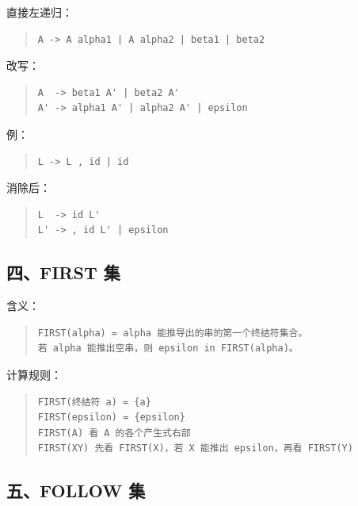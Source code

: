 \documentclass[UTF8,zihao=-4]{ctexart}
\begin{document}
直接左递归：


\begin{quote}
\footnotesize
\begin{verbatim}
A -> A alpha1 | A alpha2 | beta1 | beta2
\end{verbatim}
\end{quote}


改写：


\begin{quote}
\footnotesize
\begin{verbatim}
A  -> beta1 A' | beta2 A'
A' -> alpha1 A' | alpha2 A' | epsilon
\end{verbatim}
\end{quote}


例：


\begin{quote}
\footnotesize
\begin{verbatim}
L -> L , id | id
\end{verbatim}
\end{quote}


消除后：


\begin{quote}
\footnotesize
\begin{verbatim}
L  -> id L'
L' -> , id L' | epsilon
\end{verbatim}
\end{quote}


\subsection{四、FIRST 集}


含义：


\begin{quote}
\footnotesize
\begin{verbatim}
FIRST(alpha) = alpha 能推导出的串的第一个终结符集合。
若 alpha 能推出空串，则 epsilon in FIRST(alpha)。
\end{verbatim}
\end{quote}


计算规则：


\begin{quote}
\footnotesize
\begin{verbatim}
FIRST(终结符 a) = {a}
FIRST(epsilon) = {epsilon}
FIRST(A) 看 A 的各个产生式右部
FIRST(XY) 先看 FIRST(X)，若 X 能推出 epsilon，再看 FIRST(Y)
\end{verbatim}
\end{quote}


\subsection{五、FOLLOW 集}
\end{document}
